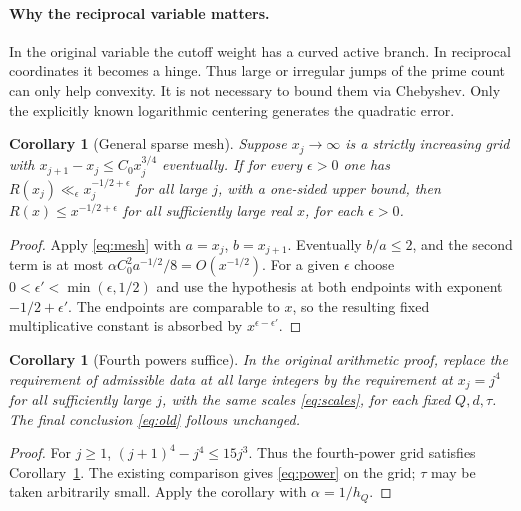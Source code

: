 \documentclass[11pt,a4paper]{article}
\newtheorem{corollary}[theorem]{Corollary}
\theoremstyle{remark}\newtheorem{remark}[theorem]{Remark}
\begin{document}
\paragraph{Why the reciprocal variable matters.} In the original variable the cutoff weight has a curved active branch. In reciprocal coordinates it becomes a hinge. Thus large or irregular jumps of the prime count can only help convexity. It is not necessary to bound them via Chebyshev. Only the explicitly known logarithmic centering generates the quadratic error.

\begin{corollary}[General sparse mesh]\label{cor:mesh}
Suppose $x_j\to\infty$ is a strictly increasing grid with $x_{j+1}-x_j\le C_0 x_j^{3/4}$ eventually. If for every $\epsilon>0$ one has $R(x_j)\ll_\epsilon x_j^{-1/2+\epsilon}$ for all large $j$, with a one-sided upper bound, then $R(x)\le x^{-1/2+\epsilon}$ for all sufficiently large real $x$, for each $\epsilon>0$.
\end{corollary}
\begin{proof}
Apply \eqref{eq:mesh} with $a=x_j$, $b=x_{j+1}$. Eventually $b/a\le2$, and the second term is at most $\alpha C_0^2 a^{-1/2}/8=O(x^{-1/2})$. For a given $\epsilon$ choose $0<\epsilon'<\min(\epsilon,1/2)$ and use the hypothesis at both endpoints with exponent $-1/2+\epsilon'$. The endpoints are comparable to $x$, so the resulting fixed multiplicative constant is absorbed by $x^{\epsilon-\epsilon'}$.
\end{proof}
\begin{corollary}[Fourth powers suffice]\label{cor:fourth}
In the original arithmetic proof, replace the requirement of admissible data at all large integers by the requirement at $x_j=j^4$ for all sufficiently large $j$, with the same scales \eqref{eq:scales}, for each fixed $Q,d,\tau$. The final conclusion \eqref{eq:old} follows unchanged.
\end{corollary}
\begin{proof}
For $j\ge1$, $(j+1)^4-j^4\le15j^3$. Thus the fourth-power grid satisfies Corollary~\ref{cor:mesh}. The existing comparison gives \eqref{eq:power} on the grid; $\tau$ may be taken arbitrarily small. Apply the corollary with $\alpha=1/h_Q$.
\end{proof}
\end{document}
